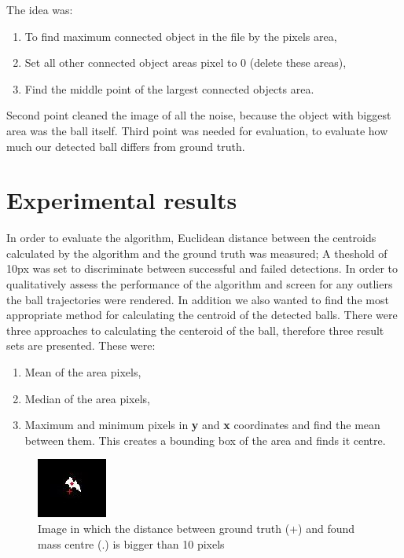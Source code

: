 \documentclass[10pt,a4paper,oneclumn]{article}
\begin{document}
The idea was: 
\begin{enumerate}
\item To find maximum connected object in the file by the pixels area, 
\item Set all other connected object areas pixel to 0 (delete these areas), 
\item Find the middle point of the largest connected objects area. 
\end{enumerate}

Second point cleaned the image of all the noise, because the object with biggest area was the ball itself. Third point was needed for evaluation, to evaluate how much our detected ball differs from ground truth.

\section{Experimental results}

In order to evaluate the algorithm, Euclidean distance between the centroids calculated by the algorithm and the ground truth was measured; A theshold of 10px was set to discriminate between successful and failed detections. In order to qualitatively assess the performance of the algorithm and screen for any outliers the ball trajectories were rendered. In addition we also wanted to find the most appropriate method for calculating the centroid of the detected balls. 
There were three  approaches to calculating the centeroid of the ball, therefore three result sets are presented. These were:

\begin{enumerate}
\item Mean of the area pixels,
\item Median of the area pixels,
\item Maximum and minimum pixels in \textbf{y} and \textbf{x} coordinates and find the mean between them. This creates a bounding box of the area and finds it centre.
\end{enumerate}

\begin{figure}[h!]
\centering
  \includegraphics{errorCroped.jpg}
\caption{Image in which the distance between ground truth (+) and found mass centre (.) is bigger than 10 pixels}
\end{figure}
\end{document}
